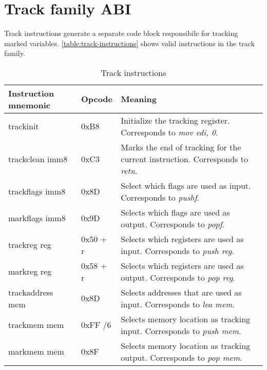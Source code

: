 \documentclass[12pt]{report}
\begin{document}
\section{Track family ABI}
\label{sec:track-family-abi}
Track instructions generate a separate code block responsibile for tracking marked variables. \autoref{table:track-instructions} shows valid instructions in the track family.\\
\begin{table}[H]
	\begin{tabular}{| l | l | p{10cm} |}
		\hline
		\textbf{Instruction mnemonic} &	\textbf{Opcode} & \textbf{Meaning}\\ \hline
		trackinit & 0xB8 & Initialize the tracking register. Corresponds to \textit{mov edi, 0}.\\ \hline
		trackclean imm8 & 0xC3 & Marks the end of tracking for the current instruction. Corresponds to \textit{retn}.\\ \hline
		trackflags imm8 & 0x8D & Select which flags are used as input. Corresponds to \textit{pushf}.\\ \hline
		markflags imm8 & 0x9D & Selects which flags are used as output. Corresponds to \textit{popf}.\\ \hline
		trackreg reg & 0x50 + r & Selects which registers are used as input. Corresponds to \textit{push reg}.\\ \hline
		markreg reg & 0x58 + r & Selects which registers are used as output. Corresponds to \textit{pop reg}.\\ \hline
		trackaddress mem & 0x8D & Selects addresses that are used as input. Corresponds to \textit{lea mem}.\\ \hline
		trackmem mem & 0xFF /6 & Selects memory location as tracking input. Corresponds to \textit{push mem}.\\ \hline
		markmem mem & 0x8F & Selects memory location as tracking output. Corresponds to \textit{pop mem}.\\ \hline
	\end{tabular}
	\caption{Track instructions}
	\label{table:track-instructions}
\end{table}
\end{document}

